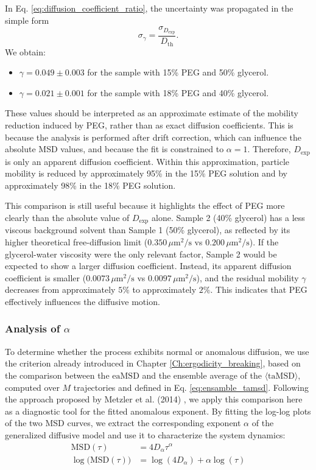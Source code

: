 In Eq. \ref{eq:diffusion_coefficient_ratio}, the uncertainty was propagated in the simple form
$$\sigma_{\gamma} = \frac{\sigma_{D_{\mathrm{exp}}}}{D_{\mathrm{th}}}.$$
We obtain:
\begin{itemize}
    \item $\gamma = 0.049 \pm 0.003$ for the sample with 15\% PEG and 50\% glycerol.
    \item $\gamma = 0.021 \pm 0.001$ for the sample with 18\% PEG and 40\% glycerol.
\end{itemize}

These values should be interpreted as an approximate estimate of the mobility reduction induced by PEG, rather than as exact diffusion coefficients. This is because the analysis is performed after drift correction, which can influence the absolute MSD values, and because the fit is constrained to $\alpha = 1$. Therefore, $D_{\mathrm{exp}}$ is only an apparent diffusion coefficient. Within this approximation, particle mobility is reduced by approximately 95\% in the 15\% PEG solution and by approximately 98\% in the 18\% PEG solution.

This comparison is still useful because it highlights the effect of PEG more clearly than the absolute value of $D_{\mathrm{exp}}$ alone. Sample 2 (40\% glycerol) has a less viscous background solvent than Sample 1 (50\% glycerol), as reflected by its higher theoretical free-diffusion limit ($0.350 \, \mu\mathrm{m}^2/\mathrm{s}$ vs $0.200\,\mu\mathrm{m}^2/\mathrm{s}$). If the glycerol-water viscosity were the only relevant factor, Sample 2 would be expected to show a larger diffusion coefficient. Instead, its apparent diffusion coefficient is smaller ($0.0073 \, \mu\mathrm{m}^2/\mathrm{s}$ vs $0.0097\,\mu\mathrm{m}^2/\mathrm{s}$), and the residual mobility $\gamma$ decreases from approximately $5\%$ to approximately $2\%$. This indicates that PEG effectively influences the diffusive motion.

\subsubsection{Analysis of \texorpdfstring{$\alpha$}{alpha}}
To determine whether the process exhibits normal or anomalous diffusion, we use the criterion already introduced in Chapter \ref{Ch:ergodicity_breaking}, based on the comparison between the $\mathrm{eaMSD}$ and the ensemble average of the $\langle \mathrm{taMSD} \rangle$, computed over $M$ trajectories and defined in Eq. \ref{eq:ensamble_tamsd}. Following the approach proposed by Metzler et al. (2014) \cite{C4CP03465A}, we apply this comparison here as a diagnostic tool for the fitted anomalous exponent. By fitting the log-log plots of the two MSD curves, we extract the corresponding exponent $\alpha$ of the generalized diffusive model and use it to characterize the system dynamics:
\begin{align}
    \mathrm{MSD}(\tau) &= 4D_{\alpha}\tau^{\alpha} \\
    \log\!\bigl(\mathrm{MSD}(\tau)\bigr) &= \log(4D_{\alpha}) + \alpha\log(\tau)
\end{align}

